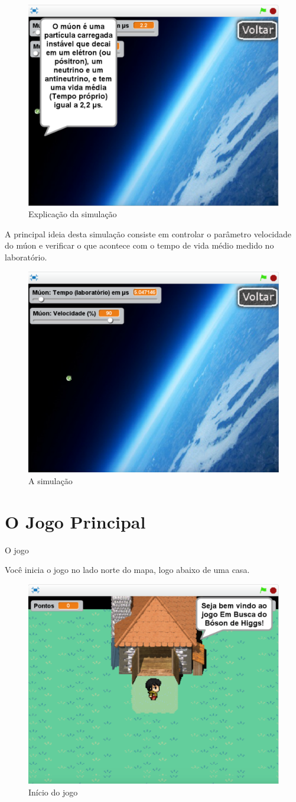 \documentclass[12pt,fleqn]{book} %
\begin{document}
\begin{figure}[h]
	\centering
	\includegraphics[width=0.6 \textwidth]{Produto/sim1}
	\caption{Explicação da simulação}
	\label{fig:app_a:sim1}
\end{figure}

A principal ideia desta simulação consiste em controlar o parâmetro velocidade do múon e verificar o que acontece com o tempo de vida médio medido no laboratório.

\begin{figure}[h]
	\centering
	\includegraphics[width=0.6 \textwidth]{Produto/sim2}
	\caption{A simulação}
	\label{fig:app_a:sim2}
\end{figure}


\section{O Jogo Principal}
O jogo 

Você inicia o jogo no lado norte do mapa, logo abaixo de uma casa. 

\begin{figure}[h]
	\centering
	\includegraphics[width=0.65 \textwidth]{Produto/jogo_1}
	\caption{Início do jogo}
	\label{fig:app_a:jogo1}
\end{figure}
\end{document}
